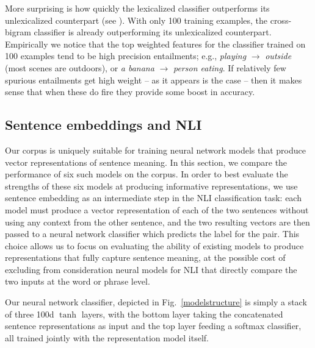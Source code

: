 More surprising is how quickly the lexicalized classifier outperforms its
  unlexicalized counterpart (see ).
With only 100 training examples, the cross-bigram classifier is already
  outperforming its unlexicalized counterpart.
Empirically we notice that the top weighted features for the classifier
  trained on 100 examples tend to be high precision entailments;
  e.g.,
  \textit{playing} $\rightarrow$ \textit{outside}
  (most scenes are outdoors), or \textit{a banana} $\rightarrow$
  \textit{person eating}.
If relatively few spurious entailments get high weight -- as it appears
  is the case -- then it makes sense that when these do fire they
  provide some boost in accuracy.



\subsection{Sentence embeddings and NLI}\label{sentence-embedding}

Our corpus is uniquely suitable for training neural network models that produce vector representations of sentence meaning. In this section, we compare the performance of six such models on the corpus. 
In order to best evaluate the strengths of these six models at producing informative representations, we use sentence embedding as an intermediate step in the NLI classification task: each model must produce a vector representation of each of the two sentences without using any context from the other sentence, and the two resulting vectors are then passed to a neural network classifier which predicts the label for the pair. This choice allows us to focus on evaluating the ability of existing models to produce representations that fully capture sentence meaning, at the possible cost of excluding from consideration neural models for NLI that directly compare the two inputs at the word or phrase level.



Our neural network classifier, depicted in Fig.~\ref{modelstructure} is simply a stack of three 100d $\tanh$ layers, with the bottom layer taking the concatenated sentence representations as input and the top layer feeding a softmax classifier, all trained jointly with the representation model itself.

